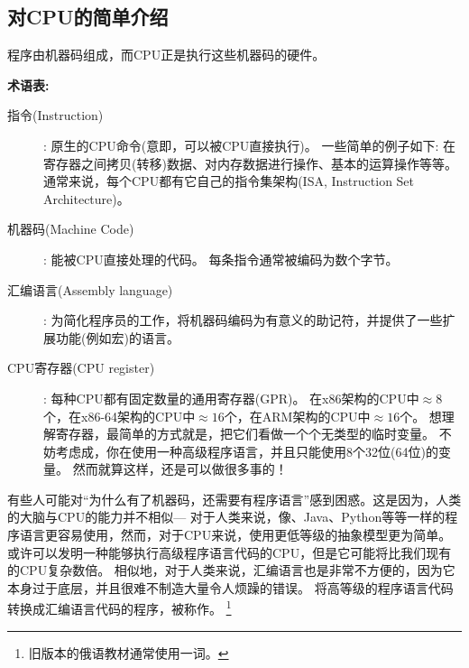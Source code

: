 \subsection{对CPU的简单介绍}

程序由机器码组成，而\ac{CPU}正是执行这些机器码的硬件。

\textbf{术语表:}

\begin{description}
\item[指令(Instruction)]: 原生的\ac{CPU}命令(意即，可以被CPU直接执行)。
一些简单的例子如下: 在寄存器之间拷贝(转移)数据、对内存数据进行操作、基本的运算操作等等。
通常来说，每个\ac{CPU}都有它自己的指令集架构(\ac{ISA}, Instruction Set Architecture)。

\item[机器码(Machine Code)]: 能被\ac{CPU}直接处理的代码。
每条指令通常被编码为数个字节。
\item[汇编语言(Assembly language)]: 为简化程序员的工作，将机器码编码为有意义的助记符，并提供了一些扩展功能(例如宏)的语言。
\item[CPU寄存器(CPU register)]: 每种\ac{CPU}都有固定数量的通用寄存器(\ac{GPR})。
在x86架构的CPU中$\approx 8$个，在x86-64架构的CPU中$\approx 16$个，在ARM架构的CPU中$\approx 16$个。
想理解寄存器，最简单的方式就是，把它们看做一个个无类型的临时变量。
不妨考虑成，你在使用一种高级\ac{程序语言}，并且只能使用8个32位(64位)的变量。
然而就算这样，还是可以做很多事的！
\end{description}




有些人可能对“为什么有了机器码，还需要有\ac{程序语言}”感到困惑。这是因为，人类的大脑与\ac{CPU}的能力并不相似---%
对于人类来说，像\CCpp、Java、Python等等一样的\ac{程序语言}更容易使用，然而，对于\ac{CPU}来说，使用更低等级的抽象模型更为简单。
或许可以发明一种能够执行高级\ac{程序语言}代码的\ac{CPU}，但是它可能将比我们现有的\ac{CPU}复杂数倍。
相似地，对于人类来说，汇编语言也是非常不方便的，因为它本身过于底层，并且很难不制造大量令人烦躁的错误。
将高等级的\ac{程序语言}代码转换成汇编语言代码的程序，被称作。
\footnote{旧版本的俄语教材通常使用一词。}

